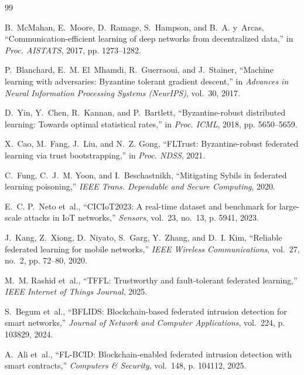 \documentclass[12pt,a4paper]{report}
\begin{document}
\newpage
\begin{thebibliography}{99}

B.~McMahan, E.~Moore, D.~Ramage, S.~Hampson, and B.~A. y~Arcas, ``Communication-efficient learning of deep networks from decentralized data,'' in \emph{Proc. AISTATS}, 2017, pp. 1273--1282.

P.~Blanchard, E.~M. El~Mhamdi, R.~Guerraoui, and J.~Stainer, ``Machine learning with adversaries: Byzantine tolerant gradient descent,'' in \emph{Advances in Neural Information Processing Systems (NeurIPS)}, vol.~30, 2017.

D.~Yin, Y.~Chen, R.~Kannan, and P.~Bartlett, ``Byzantine-robust distributed learning: Towards optimal statistical rates,'' in \emph{Proc. ICML}, 2018, pp. 5650--5659.

X.~Cao, M.~Fang, J.~Liu, and N.~Z. Gong, ``FLTrust: Byzantine-robust federated learning via trust bootstrapping,'' in \emph{Proc. NDSS}, 2021.

C.~Fung, C.~J.~M. Yoon, and I.~Beschastnikh, ``Mitigating Sybils in federated learning poisoning,'' \emph{IEEE Trans. Dependable and Secure Computing}, 2020.

E.~C. P.~Neto et~al., ``CICIoT2023: A real-time dataset and benchmark for large-scale attacks in IoT networks,'' \emph{Sensors}, vol.~23, no.~13, p. 5941, 2023.

J.~Kang, Z.~Xiong, D.~Niyato, S.~Garg, Y.~Zhang, and D.~I. Kim, ``Reliable federated learning for mobile networks,'' \emph{IEEE Wireless Communications}, vol.~27, no.~2, pp. 72--80, 2020.

M.~M. Rashid et~al., ``TFFL: Trustworthy and fault-tolerant federated learning,'' \emph{IEEE Internet of Things Journal}, 2025.

S.~Begum et~al., ``BFLIDS: Blockchain-based federated intrusion detection for smart networks,'' \emph{Journal of Network and Computer Applications}, vol.~224, p. 103829, 2024.

A.~Ali et~al., ``FL-BCID: Blockchain-enabled federated intrusion detection with smart contracts,'' \emph{Computers \& Security}, vol.~148, p. 104112, 2025.

\end{thebibliography}
\end{document}
